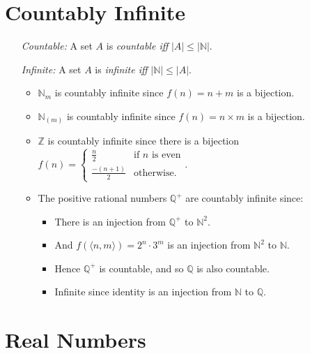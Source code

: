 \documentclass[a4paper, 11pt]{article} %
\newcommand{\tuple}[1]{\langle#1\rangle} %
\newcommand{\abs}[1]{|#1|} %
\newcommand{\N}{\mathbb{N}}
\newcommand{\Z}{\mathbb{Z}}
\renewcommand{\Pr}{\mathbb{P}}
\newcommand{\Q}{\mathbb{Q}}
\begin{document}
\section*{Countably Infinite}

\begin{enumerate}
  \item[\it Countable:] A set $A$ is \textit{countable iff} $\abs{A} \leq \abs{\N}$.
  \item[\it Infinite:] A set $A$ is \textit{infinite iff} $\abs{\N} \leq \abs{A}$.
    \begin{itemize}[leftmargin=-.2in]
      \item $\N_m$ is countably infinite since $f(n) = n + m$ is a bijection.  
      \item $\N_{(m)}$ is countably infinite since $f(n) = n \times m$ is a bijection.
      \item $\Z$ is countably infinite since there is a bijection $f(n) = 
        \begin{cases}
          \frac{n}{2}       & \text{if } n \text{ is even}\\
          \frac{-(n+1)}{2}  & \text{otherwise.}
        \end{cases}$.
      \item The positive rational numbers $\Q^+$ are countably infinite since: 
        \begin{itemize}
          \item There is an injection from $\Q^+$ to $\N^2$. 
          \item And $f(\tuple{n,m})=2^n \cdot 3^m$ is an injection from $\N^2$ to $\N$.
          \item Hence $\Q^+$ is countable, and so $\Q$ is also countable. 
          \item Infinite since identity is an injection from $\N$ to $\Q$. 
        \end{itemize}
    \end{itemize}
\end{enumerate}




\section*{Real Numbers}
\end{document}
